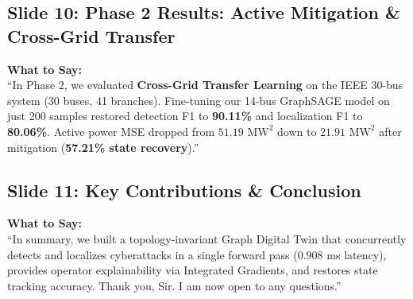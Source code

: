 \documentclass[11pt,a4paper]{article}
\begin{document}
\subsection{Slide 10: Phase 2 Results: Active Mitigation \& Cross-Grid Transfer}
\begin{mdframed}[style=saystyle]
\textbf{What to Say:}\\
``In Phase 2, we evaluated \textbf{Cross-Grid Transfer Learning} on the IEEE 30-bus system (30 buses, 41 branches). Fine-tuning our 14-bus GraphSAGE model on just 200 samples restored detection F1 to \textbf{90.11\%} and localization F1 to \textbf{80.06\%}. Active power MSE dropped from $51.19\text{ MW}^2$ down to $21.91\text{ MW}^2$ after mitigation (\textbf{57.21\% state recovery}).''
\end{mdframed}

\subsection{Slide 11: Key Contributions \& Conclusion}
\begin{mdframed}[style=saystyle]
\textbf{What to Say:}\\
``In summary, we built a topology-invariant Graph Digital Twin that concurrently detects and localizes cyberattacks in a single forward pass ($0.908$ ms latency), provides operator explainability via Integrated Gradients, and restores state tracking accuracy. Thank you, Sir. I am now open to any questions.''
\end{mdframed}
\end{document}
